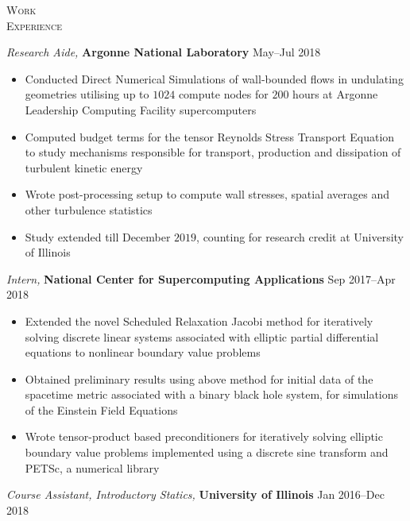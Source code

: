 \documentclass[10pt]{article}
\begin{document}
\begin{multicols}{2}
\textsc{\small Work \\ Experience}
\columnbreak

{\sl Research Aide,} \textbf{Argonne National Laboratory} \hfill May--Jul 2018

\vspace{-2.0em}
\begin{itemize}[label=-]
    \setlength\itemsep{-0.5em}
    \item Conducted Direct Numerical Simulations of wall-bounded flows in undulating geometries utilising up to $1024$ compute nodes for $200$ hours at Argonne Leadership Computing Facility supercomputers
    \item Computed budget terms for the tensor Reynolds Stress Transport Equation to study mechanisms responsible for transport, production and dissipation of turbulent kinetic energy%
    \item Wrote post-processing setup to compute wall stresses, spatial averages and other turbulence statistics
    \item Study extended till December $2019$, counting for research credit at University of Illinois
\end{itemize}
\vspace{-2.0em}
%
\vspace{0.5em}
%
{\sl Intern,} \textbf{National Center for Supercomputing Applications} \hfill Sep 2017--Apr 2018

\vspace{-2.0em}
\begin{itemize}[label=-]
    \setlength\itemsep{-0.5em}
    \item Extended the novel Scheduled Relaxation Jacobi method for iteratively solving discrete linear systems associated with elliptic partial differential equations to nonlinear boundary value problems
    \item Obtained preliminary results using above method for initial data of the spacetime metric associated with a binary black hole system, for simulations of the Einstein Field Equations
    \item Wrote tensor-product based preconditioners for iteratively solving elliptic boundary value problems implemented using a discrete sine transform and PETSc, a numerical library
\end{itemize}
\vspace{-2.0em}
%
\vspace{0.5em}
%
{\sl Course Assistant, Introductory Statics,} \textbf{University of Illinois} \hfill Jan 2016--Dec 2018


\end{multicols}
\end{document}
